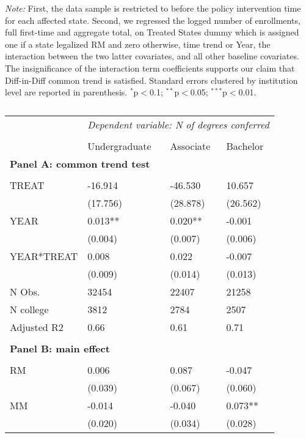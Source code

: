 \documentclass[12pt]{article}%
\begin{document}
\textit{Note:} First, the data sample is restricted to before the policy intervention time for each affected state. Second, we regressed the logged number of enrollments, full first-time and aggregate total, on  Treated States dummy which is assigned one if a state legalized RM and zero otherwise, time trend or Year, the interaction between the two latter covariates, and all other baseline covariates. The insignificance of the interaction term coefficients supports our claim that Diff-in-Diff common trend is satisfied. Standard errors clustered by institution level are reported in parenthesis. $^{*}$p$<$0.1; $^{**}$p$<$0.05; $^{***}$p$<$0.01.

\newpage
\FloatBarrier
\begin{table}\centering 
  \begin{threeparttable}
  \caption{ }
   \label{table:compl}
\begin{tabular}{llll}
\toprule
 &  \multicolumn{3}{c}{\textit{Dependent variable: N of degrees conferred}} \\ 
\cline{2-4}  \\[-1.8ex] 
& Undergraduate & Associate & Bachelor \\
\midrule
\multicolumn{4}{l}{\textbf{Panel A: common trend test} }\\  \\[-1.8ex] 
TREAT & -16.914 & -46.530 & 10.657 \\
& (17.756) & (28.878) & (26.562) \\
YEAR & 0.013** & 0.020** & -0.001 \\
& (0.004) & (0.007) & (0.006) \\
YEAR*TREAT & 0.008 & 0.022 & -0.007 \\
& (0.009) & (0.014) & (0.013) \\
\cline{2-4} 
N Obs. & 32454 & 22407 & 21258 \\
N college & 3812 & 2784 & 2507 \\
Adjusted R2 & 0.66 & 0.61 & 0.71 \\
\hline \\[-1.8ex] 
\multicolumn{4}{l}{\textbf{Panel B: main effect}}\\  \\[-1.8ex] 
RM & 0.006 & 0.087 & -0.047 \\
& (0.039) & (0.067) & (0.060) \\
MM & -0.014 & -0.040 & 0.073** \\
& (0.020) & (0.034) & (0.028) \\

\end{tabular}
\end{threeparttable}
\end{table}
\end{document}
